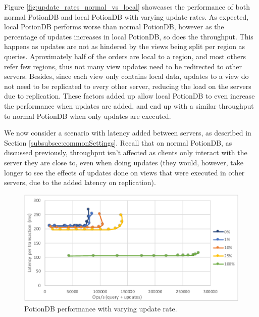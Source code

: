 \documentclass{vldb}
\newcommand{\grumbler}[2]{{\color{red}{\bf #1:} #2}}
\renewcommand{\grumbler}[2]{}
\newcommand{\andre}[1]{\grumbler{andre}{#1}}
\begin{document}
\andre{Note: I'm not sure on the explanation below. Basically, in local mode, more update ops are done per transaction, thus actually less orders are updated in the same period of time. However, since views are local, there's less replication work. Not much redirection is done as 50\% of the orders are fully local, and most others have few regions.}

\andre{IMPORTANT: I need to refer somewhere that we adapted TPC-H's data to have locality. Where should I do that? This actually beneficts more the "local PotionDB" than the normal one.}

Figure \ref{fig:update_rates_normal_vs_local} showcases the performance of both normal PotionDB and local PotionDB with varying update rates.
As expected, local PotionDB performs worse than normal PotionDB, however as the percentage of updates increases in local PotionDB, so does the throughput.
This happens as updates are not as hindered by the views being split per region as queries.
Aproximately half of the orders are local to a region, and most others refer few regions, thus not many view updates need to be redirected to other servers.
Besides, since each view only contains local data, updates to a view do not need to be replicated to every other server, reducing the load on the servers due to replication.
These factors added up allow local PotionDB to even increase the performance when updates are added, and end up with a similar throughput to normal PotionDB when only updates are executed.

\andre{Maybe a graph of local VS normal PotionDB with updates of all views and only queries of Q5? That query has high performance in both modes - may be interesting to see how it scales with updates (I wonder if local PotionDB has higher throughput than normal in that scenario?)}
 
We now consider a scenario with latency added between servers, as described in Section \ref{subsubsec:commonSettings}.
Recall that on normal PotionDB, as discussed previously, throughput isn't affected as clients only interact with the server they are close to, even when doing updates (they would, however, take longer to see the effects of updates done on views that were executed in other servers, due to the added latency on replication).

\begin{figure}
	\centering
	\includegraphics[width=.95\linewidth]{updRate_tc_cut}
	\caption{PotionDB performance with varying update rate.}
	\label{fig:update_rates_tc}
\end{figure}
\end{document}
